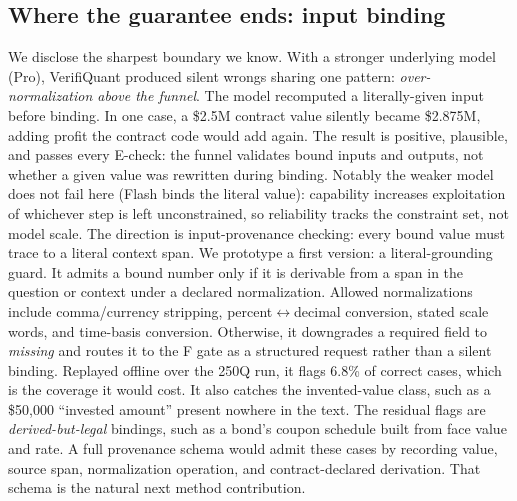 \subsection{Where the guarantee ends: input binding}\label{sec:binding}
We disclose the sharpest boundary we know.
With a stronger underlying model (Pro), VerifiQuant produced silent wrongs sharing one pattern: \emph{over-normalization above the funnel}.
The model recomputed a literally-given input before binding.
In one case, a \$2.5M contract value silently became \$2.875M, adding profit the contract code would add again.
The result is positive, plausible, and passes every E-check: the funnel validates bound inputs and outputs, not whether a given value was rewritten during binding.
Notably the weaker model does not fail here (Flash binds the literal value): capability increases exploitation of whichever step is left unconstrained, so reliability tracks the constraint set, not model scale.
The direction is input-provenance checking: every bound value must trace to a literal context span.
We prototype a first version: a literal-grounding guard.
It admits a bound number only if it is derivable from a span in the question or context under a declared normalization.
Allowed normalizations include comma/currency stripping, percent$\leftrightarrow$decimal conversion, stated scale words, and time-basis conversion.
Otherwise, it downgrades a required field to \emph{missing} and routes it to the F gate as a structured request rather than a silent binding.
Replayed offline over the 250Q run, it flags 6.8\% of correct cases, which is the coverage it would cost.
It also catches the invented-value class, such as a \$50{,}000 ``invested amount'' present nowhere in the text.
The residual flags are \emph{derived-but-legal} bindings, such as a bond's coupon schedule built from face value and rate.
A full provenance schema would admit these cases by recording value, source span, normalization operation, and contract-declared derivation.
That schema is the natural next method contribution.

